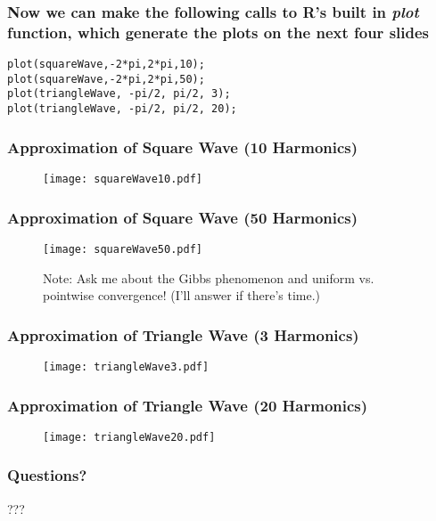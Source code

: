 \documentclass{beamer}
\begin{document}
\begin{frame}[fragile]
   \frametitle{Now we can make the following calls to R's built in \emph{plot} function, which generate the plots on the next four slides}
   \begin{center}
   \begin{minipage}{100mm}
   \begin{lstlisting}
plot(squareWave,-2*pi,2*pi,10);
plot(squareWave,-2*pi,2*pi,50);
plot(triangleWave, -pi/2, pi/2, 3);
plot(triangleWave, -pi/2, pi/2, 20);
   \end{lstlisting}
   \end{minipage}
   \end{center}
\end{frame}

\begin{frame}[fragile]
   \frametitle{Approximation of Square Wave (10 Harmonics)}
   \begin{figure}
   \texttt{[image: squareWave10.pdf]}
   \end{figure}
\end{frame}

\begin{frame}[fragile]
   \frametitle{Approximation of Square Wave (50 Harmonics)}
   \begin{figure}
      \caption{Note: Ask me about the Gibbs phenomenon and uniform vs. pointwise convergence! (I'll answer if there's time.)}
      \texttt{[image: squareWave50.pdf]}
   \end{figure}
\end{frame}

\begin{frame}[fragile]
   \frametitle{Approximation of Triangle Wave (3 Harmonics)}
   \begin{figure}
   \texttt{[image: triangleWave3.pdf]}
   \end{figure}
\end{frame}

\begin{frame}[fragile]
   \frametitle{Approximation of Triangle Wave (20 Harmonics)}
   \begin{figure}
   \texttt{[image: triangleWave20.pdf]}
   \end{figure}
\end{frame}

\begin{frame}
   \frametitle{Questions?}
   \begin{center}
      {\fontsize{50}{60}\selectfont ???}
   \end{center}
\end{frame}
\end{document}
